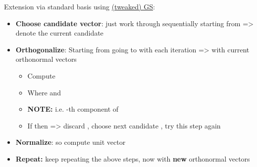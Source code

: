 Extension via standard basis
using \underline{\textbar(tweaked) GS}:

\begin{itemize}

      \item
            \textbf{Choose candidate vector}: just work through
             sequentially starting
            from  =\textgreater{} denote the current
            candidate 
      \item
            \textbf{Orthogonalize}: Starting from  going to
             with each iteration =\textgreater{} with current
            orthonormal vectors 

            \begin{itemize}
                  \item
                        Compute
                  \item Where  and
                  \item
                        \textbf{NOTE:}
                        i.e. -th component of 
                  \item
                        If  then
                        =\textgreater{} discard , choose next
                        candidate , try this step again
            \end{itemize}
      \item
            \textbf{Normalize}:  so
            compute unit vector
      \item
            \textbf{Repeat:} keep repeating the above steps, now with
            \textbf{new} orthonormal vectors
\end{itemize}


